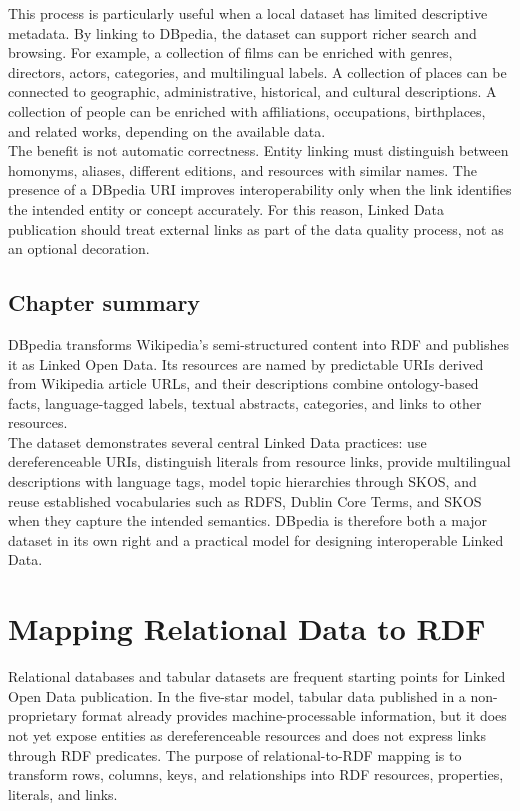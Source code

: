 \documentclass{scrbook}
\begin{document}
	This process is particularly useful when a local dataset has limited descriptive metadata. By linking to DBpedia, the dataset can support richer search and browsing. For example, a collection of films can be enriched with genres, directors, actors, categories, and multilingual labels. A collection of places can be connected to geographic, administrative, historical, and cultural descriptions. A collection of people can be enriched with affiliations, occupations, birthplaces, and related works, depending on the available data.\\
	
	The benefit is not automatic correctness. Entity linking must distinguish between homonyms, aliases, different editions, and resources with similar names. The presence of a DBpedia URI improves interoperability only when the link identifies the intended entity or concept accurately. For this reason, Linked Data publication should treat external links as part of the data quality process, not as an optional decoration.
	
	\section{Chapter summary}
	
	DBpedia transforms Wikipedia's semi-structured content into RDF and publishes it as Linked Open Data. Its resources are named by predictable URIs derived from Wikipedia article URLs, and their descriptions combine ontology-based facts, language-tagged labels, textual abstracts, categories, and links to other resources.\\
	
	The dataset demonstrates several central Linked Data practices: use dereferenceable URIs, distinguish literals from resource links, provide multilingual descriptions with language tags, model topic hierarchies through SKOS, and reuse established vocabularies such as RDFS, Dublin Core Terms, and SKOS when they capture the intended semantics. DBpedia is therefore both a major dataset in its own right and a practical model for designing interoperable Linked Data.
	
	\chapter{Mapping Relational Data to RDF}
	
	Relational databases and tabular datasets are frequent starting points for Linked Open Data publication. In the five-star model, tabular data published in a non-proprietary format already provides machine-processable information, but it does not yet expose entities as dereferenceable resources and does not express links through RDF predicates. The purpose of relational-to-RDF mapping is to transform rows, columns, keys, and relationships into RDF resources, properties, literals, and links.\\
	
\end{document}
